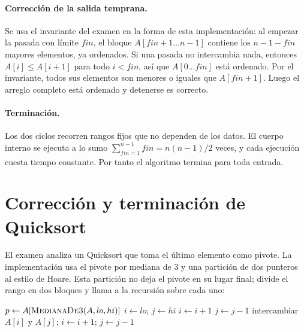 \documentclass[11pt]{article}
\begin{document}
\paragraph{Corrección de la salida temprana.} Se usa el invariante del examen en la forma de esta implementación: al empezar la pasada con límite $\mathit{fin}$, el bloque $A[\mathit{fin}+1 \ldots n-1]$ contiene los $n-1-\mathit{fin}$ mayores elementos, ya ordenados. Si una pasada no intercambia nada, entonces $A[i] \le A[i+1]$ para todo $i < \mathit{fin}$, así que $A[0 \ldots \mathit{fin}]$ está ordenado. Por el invariante, todos sus elementos son menores o iguales que $A[\mathit{fin}+1]$. Luego el arreglo completo está ordenado y detenerse es correcto.

\paragraph{Terminación.} Los dos ciclos recorren rangos fijos que no dependen de los datos. El cuerpo interno se ejecuta a lo sumo $\sum_{\mathit{fin}=1}^{n-1} \mathit{fin} = n(n-1)/2$ veces, y cada ejecución cuesta tiempo constante. Por tanto el algoritmo termina para toda entrada.

\section{Corrección y terminación de Quicksort}

El examen analiza un Quicksort que toma el último elemento como pivote. La implementación usa el pivote por mediana de 3 y una partición de dos punteros al estilo de Hoare. Esta partición no deja el pivote en su lugar final; divide el rango en dos bloques y llama a la recursión sobre cada uno:

\begin{algorithmic}[1]
   \Return \EndIf
  \State $p \gets A[\textsc{MedianaDe3}(A, lo, hi)]$
  \State $i \gets lo$; $j \gets hi$
     $i \gets i+1$ \EndWhile
     $j \gets j-1$ \EndWhile
      \State intercambiar $A[i]$ y $A[j]$; $i \gets i+1$; $j \gets j-1$
    \EndIf
  \EndWhile
  \State {}
  \State {}
\EndFunction
\end{algorithmic}
\end{document}
